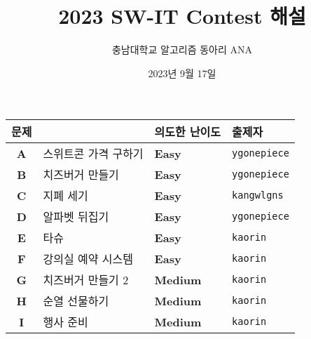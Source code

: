
\usetikzlibrary{arrows.meta,matrix,decorations.pathreplacing}

\title{2023 SW-IT Contest 해설}
\author{충남대학교 알고리즘 동아리 ANA}
\date{2023년 9월 17일}


    \setcounter{framenumber}{-1}
    \frame{\titlepage}
        
    \begin{frame} %
        \begin{center}
            \begin{tabular}{cl|l|l}
                \hline
                문제 & & 의도한 난이도 & 출제자 \\
                \hline
                \hline
                \textbf{A} & 스위트콘 가격 구하기& \textbf{\color{acbronze}Easy} & \texttt{ygonepiece} \\
                \textbf{B} & 치즈버거 만들기 & \textbf{\color{acbronze}Easy} & \texttt{ygonepiece} \\
                \textbf{C} & 지폐 세기 & \textbf{\color{acbronze}Easy} & \texttt{kangwlgns} \\
                \textbf{D} & 알파벳 뒤집기 & \textbf{\color{acbronze}Easy} & \texttt{ygonepiece} \\
                \textbf{E} & 타슈 & \textbf{\color{acbronze}Easy} & \texttt{kaorin} \\
                \textbf{F} & 강의실 예약 시스템 & \textbf{\color{acsilver}Easy} & \texttt{kaorin} \\
                \textbf{G} & 치즈버거 만들기 2 & \textbf{\color{acsilver}Medium} & \texttt{kaorin} \\
                \textbf{H} & 순열 선물하기 & \textbf{\color{acsilver}Medium} & \texttt{kaorin} \\
                \textbf{I} & 행사 준비 & \textbf{\color{acgold}Medium} & \texttt{kaorin} \\
                \hline
            \end{tabular}
        \end{center}
    \end{frame}

